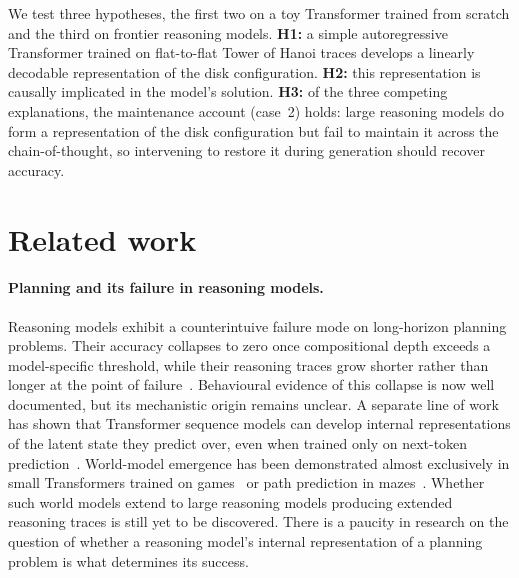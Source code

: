 \documentclass{article} %
\begin{document}
We test three hypotheses, the first two on a toy Transformer trained from scratch and the third on frontier reasoning models. \textbf{H1:} a simple autoregressive Transformer trained on flat-to-flat Tower of Hanoi traces develops a linearly decodable representation of the disk configuration. \textbf{H2:} this representation is causally implicated in the model's solution. \textbf{H3:} of the three competing explanations, the maintenance account (case~2) holds: large reasoning models do form a representation of the disk configuration but fail to maintain it across the chain-of-thought, so intervening to restore it during generation should recover accuracy.

\section{Related work}
\label{sec:related-work}

\paragraph{Planning and its failure in reasoning models.}
Reasoning models exhibit a counterintuive failure mode on long-horizon planning problems. Their accuracy collapses to zero once compositional depth exceeds a model-specific threshold, while their reasoning traces grow shorter rather than longer at the point of failure~\citep{shojaee2025illusion}. Behavioural evidence of this collapse is now well documented, but its mechanistic origin remains unclear. A separate line of work has shown that Transformer sequence models can develop internal representations of the latent state they predict over, even when trained only on next-token prediction~\citep{li2022emergent, toshniwal2022chess}. World-model emergence has been demonstrated almost exclusively in small Transformers trained on games~\citep{li2022emergent, toshniwal2022chess} or path prediction in mazes~\citep{spies2025transformers}. Whether such world models extend to large reasoning models producing extended reasoning traces is still yet to be discovered. There is a paucity in research on the question of whether a reasoning model's internal representation of a planning problem is what determines its success. 
\end{document}
